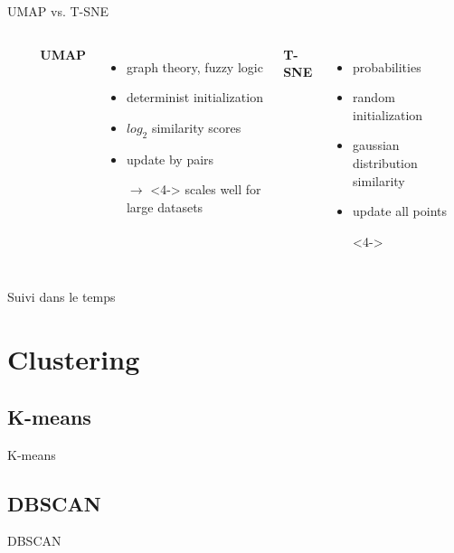 \documentclass{irdbeamer}
\begin{document}
\begin{frame}{UMAP vs. T-SNE}
\begin{columns}
\begin{column}{0.05\textwidth}
\begin{itemize}
    \item[] 
    \item[] 
    \item[] 
    \item[] 
    \item[] 
\end{itemize}
\end{column}
        \textbf{UMAP}
        \begin{itemize}
            \item<1-> graph theory, fuzzy logic
            \item<2-> determinist initialization
            \item<3-> $log_2$ similarity scores
            \item<4-> update by pairs 
            \item[$\rightarrow$]<4-> scales well for large datasets
        \end{itemize}
        \textbf{T-SNE}
        \begin{itemize}
            \item<1-> probabilities
            \item<2-> random initialization
            \item<3-> gaussian distribution similarity
            \item<4-> update all points
            \item[]<4->
        \end{itemize}
\end{columns}
\end{frame}

\begin{frame}{Suivi dans le temps}
    \centering
\end{frame}
\section{Clustering}

\subsection{K-means}
\begin{frame}{K-means}
    
\end{frame}

\subsection{DBSCAN}
\begin{frame}{DBSCAN}
    
\end{frame}
\end{document}
